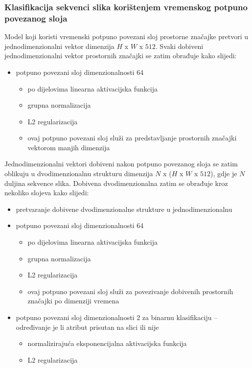 \documentclass[times, utf8, diplomski, numeric]{fer}
\begin{document}
\subsubsection{Klasifikacija sekvenci slika korištenjem vremenskog potpuno povezanog sloja}
Model koji koristi vremenski potpuno povezani sloj prostorne značajke pretvori u jednodimenzionalni vektor dimenzija $H$ x $W$ x $512$.
Svaki dobiveni jednodimenzionalni vektor prostornih značajki se zatim obrađuje kako slijedi:
\begin{itemize}
  \item potpuno povezani sloj dimenzionalnosti 64
 \begin{itemize}
  \item po dijelovima linearna  aktivacijska funkcija
  \item grupna normalizacija 
  \item L2 regularizacija
  \item ovaj potpuno povezani sloj služi za predstavljanje prostornih značajki vektorom manjih dimenzija
 \end{itemize}
\end{itemize}
Jednodimenzionalni vektori dobiveni nakon potpuno povezanog sloja se zatim oblikuju u dvodimenzionalnu strukturu dimenzija $N$ x ($H$ x $W$ x $512$), gdje je $N$ duljina sekvence slika.
Dobivena dvodimenzionalna zatim se obrađuje kroz nekoliko slojeva kako slijedi:
\begin{itemize}
 \item pretvaranje dobivene dvodimenzionalne strukture u jednodimenzionalnu
 \item potpuno povezani sloj dimenzionalnosti 64
 \begin{itemize}
  \item po dijelovima linearna  aktivacijska funkcija
  \item grupna normalizacija 
  \item L2 regularizacija
  \item ovaj potpuno povezani sloj služi za povezivanje dobivenih prostornih značajki po dimenziji vremena
 \end{itemize}
 \item potpuno povezani sloj dimenzionalnosti 2 za binarnu klasifikaciju -- određivanje je li atribut prisutan na slici ili nije
 \begin{itemize}
  \item normalizirajuća eksponencijalna  aktivacijska funkcija
  \item L2 regularizacija
 \end{itemize}
\end{itemize}
\end{document}

